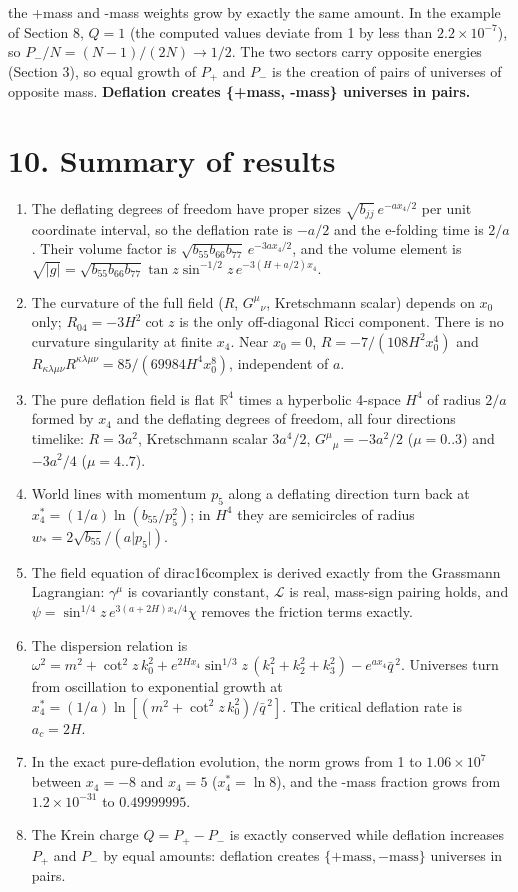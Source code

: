 \documentclass[10pt]{article}
\begin{document}
the +mass and -mass weights grow by exactly the same amount. In the example of Section 8, $Q = 1$ (the computed values deviate from 1 by less than $2.2\times10^{-7}$), so $P_-/N = (N - 1)/(2N) \to 1/2$. The two sectors carry opposite energies (Section 3), so equal growth of $P_+$ and $P_-$ is the creation of pairs of universes of opposite mass. \textbf{Deflation creates \{+mass, -mass\} universes in pairs.}


\section*{10. Summary of results}

\begin{enumerate}
\item The deflating degrees of freedom have proper sizes $\sqrt{b_{jj}}\,e^{-ax_4/2}$ per unit coordinate interval, so the deflation rate is $-a/2$ and the e-folding time is $2/a$. Their volume factor is $\sqrt{b_{55}b_{66}b_{77}}\,e^{-3ax_4/2}$, and the volume element is $\sqrt{\lvert g\rvert} = \sqrt{b_{55}b_{66}b_{77}}\tan z\sin^{-1/2}z\,e^{-3(H+a/2)x_4}$.
\item The curvature of the full field ($R$, $G^\mu{}_\nu$, Kretschmann scalar) depends on $x_0$ only; $R_{04} = -3H^2\cot z$ is the only off-diagonal Ricci component. There is no curvature singularity at finite $x_4$. Near $x_0 = 0$, $R = -7/(108H^2x_0^4)$ and $R_{\kappa\lambda\mu\nu}R^{\kappa\lambda\mu\nu} = 85/(69984H^4x_0^8)$, independent of $a$.
\item The pure deflation field is flat $\mathbb R^4$ times a hyperbolic 4-space $H^4$ of radius $2/a$ formed by $x_4$ and the deflating degrees of freedom, all four directions timelike: $R = 3a^2$, Kretschmann scalar $3a^4/2$, $G^\mu{}_\mu = -3a^2/2$ ($\mu = 0..3$) and $-3a^2/4$ ($\mu = 4..7$).
\item World lines with momentum $p_5$ along a deflating direction turn back at $x_4^* = (1/a)\ln(b_{55}/p_5^2)$; in $H^4$ they are semicircles of radius $w_* = 2\sqrt{b_{55}}/(a\lvert p_5\rvert)$.
\item The field equation of dirac16complex is derived exactly from the Grassmann Lagrangian: $\gamma^\mu$ is covariantly constant, $\mathcal L$ is real, mass-sign pairing holds, and $\psi = \sin^{1/4}z\,e^{3(a+2H)x_4/4}\chi$ removes the friction terms exactly.
\item The dispersion relation is $\omega^2 = m^2 + \cot^2 z\,k_0^2 + e^{2Hx_4}\sin^{1/3}z\,(k_1^2 + k_2^2 + k_3^2) - e^{ax_4}\bar q^{\,2}$. Universes turn from oscillation to exponential growth at $x_4^* = (1/a)\ln[(m^2 + \cot^2 z\,k_0^2)/\bar q^{\,2}]$. The critical deflation rate is $a_c = 2H$.
\item In the exact pure-deflation evolution, the norm grows from 1 to $1.06\times10^7$ between $x_4 = -8$ and $x_4 = 5$ ($x_4^* = \ln 8$), and the -mass fraction grows from $1.2\times10^{-31}$ to $0.49999995$.
\item The Krein charge $Q = P_+ - P_-$ is exactly conserved while deflation increases $P_+$ and $P_-$ by equal amounts: deflation creates $\{+\text{mass}, -\text{mass}\}$ universes in pairs.
\end{enumerate}
\end{document}
